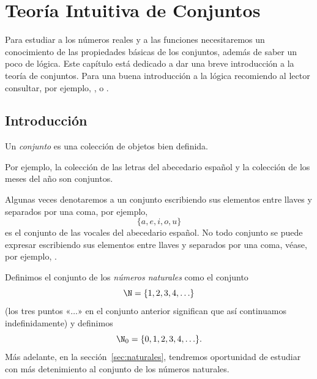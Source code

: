 \documentclass[12pt,a4paper]{book}
\begin{document}
    \nocite{%
    apostol1974, buck2004, enderton1977, galaz1992, gelbaum1992, larson2009,%
    nunez2020logica, nunez-redaccion, nunez2020calculoII, nunez2020calculoIII,%
    nunez2020analisis, nunez2020mecanica, nunez2020variable, rudin1976,%
    suppes2021, spivak1996, swokowski1998, tarski1995}

    \frontmatter
    \tableofcontents

    \mainmatter

    \chapter{Teoría Intuitiva de Conjuntos}\label{cap:conjuntos}

    Para estudiar a los números reales y a las funciones necesitaremos un
    conocimiento de las propiedades básicas de los conjuntos, además de saber
    un poco de lógica. Este capítulo está dedicado a dar una breve introducción
    a la teoría de conjuntos. Para una buena introducción a la lógica recomiendo
    al lector consultar, por ejemplo, \cite{nunez2020logica}, \cite{suppes2021} o \cite{tarski1995}.

    \section{Introducción}

    \begin{definicion}[Conjunto]\label{def:1}\label{def:conjunto}
        Un \textit{conjunto} es una colección de objetos bien definida.
    \end{definicion}

    Por ejemplo, la colección de las letras del abecedario español y la colección
    de los meses del año son conjuntos.

    Algunas veces denotaremos a un conjunto escribiendo sus elementos entre
    llaves y separados por una coma, por ejemplo,
    \begin{equation}\label{eq:vocales}
        \{a,e,i,o,u\}
    \end{equation}
    es el conjunto de las vocales del abecedario español. No todo conjunto se
    puede expresar escribiendo sus elementos entre llaves y separados por una
    coma, véase, por ejemplo, \cite{nunez2020analisis}.

    Definimos el conjunto de los \textit{números naturales} como el conjunto
    \begin{equation*}
        \N=\{1,2,3,4,\ldots\}
    \end{equation*}
    (los tres puntos «$\ldots$» en el conjunto anterior significan que así continuamos
    indefinidamente) y definimos
    \begin{equation*}
        \N_{0}=\{0,1,2,3,4,\ldots\}.
    \end{equation*}
    Más adelante, en la sección~\ref{sec:naturales}, tendremos oportunidad de estudiar con más
    detenimiento al conjunto de los números naturales.
\end{document}
